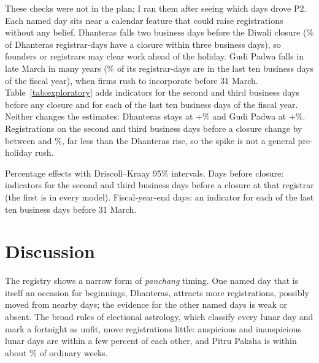 \documentclass[12pt,letterpaper]{article}
\newcommand{\panchang}{\textit{panchang}}
\begin{document}
These checks were not in the plan; I ran them after seeing which days drove P2. Each named day sits near a calendar feature that could raise registrations without any belief. Dhanteras falls two business days before the Diwali closure (\DhanterasNearClosure\% of Dhanteras registrar-days have a closure within three business days), so founders or registrars may clear work ahead of the holiday. Gudi Padwa falls in late March in many years (\GudiNearFy\% of its registrar-days are in the last ten business days of the fiscal year), when firms rush to incorporate before 31 March. Table~\ref{tab:exploratory} adds indicators for the second and third business days before any closure and for each of the last ten business days of the fiscal year. Neither changes the estimates: Dhanteras stays at +\DhanterasBoth\% and Gudi Padwa at +\GudiBoth\%. Registrations on the second and third business days before a closure change by between \AheadLo{} and \AheadHi\%, far less than the Dhanteras rise, so the spike is not a general pre-holiday rush.

\begin{table}[t]
\centering
\caption{Named days with controls for pre-holiday and year-end timing (exploratory)}
\label{tab:exploratory}
\footnotesize

\par\medskip
\begin{minipage}{0.95\textwidth}\footnotesize
Percentage effects with Driscoll--Kraay 95\% intervals. Days before closure: indicators for the second and third business days before a closure at that registrar (the first is in every model). Fiscal-year-end days: an indicator for each of the last ten business days before 31 March.
\end{minipage}
\end{table}

\section{Discussion}

The registry shows a narrow form of \panchang{} timing. One named day that is itself an occasion for beginnings, Dhanteras, attracts more registrations, possibly moved from nearby days; the evidence for the other named days is weak or absent. The broad rules of electional astrology, which classify every lunar day and mark a fortnight as unfit, move registrations little: auspicious and inauspicious lunar days are within a few percent of each other, and Pitru Paksha is within about \POneLoAbs\% of ordinary weeks.
\end{document}
